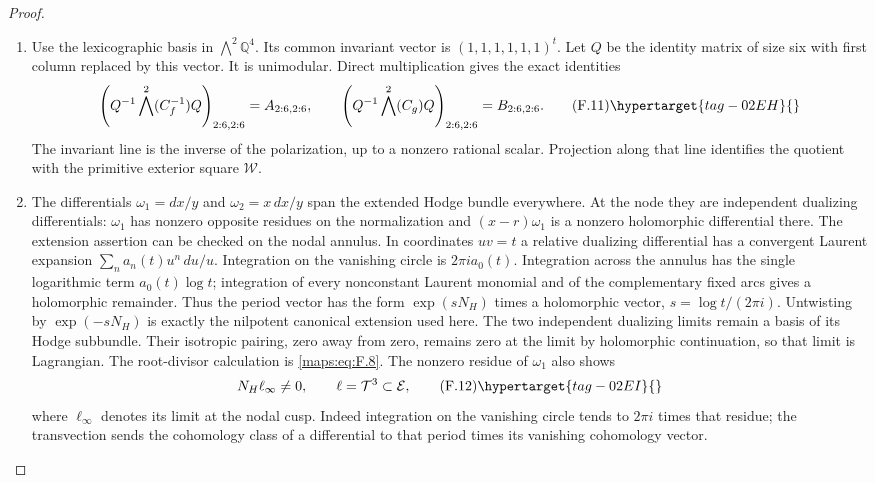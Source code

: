 \begin{proof}
\begin{enumerate}[label={$\langle1\rangle$\arabic*.}]
\[ \tag{F.10}\hypertarget{tag-02EG}{}\label{maps:eq:F.10}
\]
Their difference has rank one and their characteristic polynomials
are $f,g$.  More explicitly, put
\[
 \begin{aligned}
 \mathsf B&=(u,Ru,R^2u,R^3u),\\
 d&=(C_f-C_g)e_4=(0,-1,-1,-1)^t,\\
 \mathsf B_c&=(d,C_fd,C_f^2d,C_f^3d).
 \end{aligned}
\]
Here $\det\mathsf B_c=1$.  Uniqueness of the covector in
\eqref{maps:eq:F.9} gives the intertwiner
$\mathsf P=\mathsf B\mathsf B_c^{-1}$, with
$R\mathsf P=\mathsf P C_f$ and $S\mathsf P=\mathsf P C_g$.
Thus $(T_1,T_2)$ is rationally conjugate to
$(C_f^{-1},C_g)$, with the chosen peripheral conventions.

\item Use the lexicographic basis in $\bigwedge^2\mathbb Q^4$.
Its common invariant vector is $(1,1,1,1,1,1)^t$.
Let $Q$ be the identity matrix of size six with first column
replaced by this vector.  It is unimodular.  Direct multiplication
gives the exact identities
\[
 \left(Q^{-1}\bigwedge^2(C_f^{-1})Q\right)_{2:6,2:6}
   =A_{2:6,2:6},\qquad
 \left(Q^{-1}\bigwedge^2(C_g)Q\right)_{2:6,2:6}
   =B_{2:6,2:6}.
 \tag{F.11}\hypertarget{tag-02EH}{}\label{maps:eq:F.11}
\]
The invariant line is the inverse of the polarization, up to a
nonzero rational scalar.  Projection along that line identifies
the quotient with the primitive exterior square $\mathcal W$.

\item The differentials $\omega_1=dx/y$ and $\omega_2=x\,dx/y$ span
the extended Hodge bundle everywhere.  At the node they are
independent dualizing differentials: $\omega_1$ has nonzero
opposite residues on the normalization and
$(x-r)\omega_1$ is a nonzero holomorphic differential there.
The extension assertion can be checked on the nodal annulus.
In coordinates $uv=t$ a relative dualizing differential has
a convergent Laurent expansion
$\sum_n a_n(t)u^n\,du/u$.  Integration on the vanishing circle
is $2\pi i a_0(t)$.  Integration across the annulus has the
single logarithmic term $a_0(t)\log t$; integration of every
nonconstant Laurent monomial and of the complementary fixed
arcs gives a holomorphic remainder.  Thus the period vector
has the form $\exp(sN_H)$ times a holomorphic vector,
$s=\log t/(2\pi i)$.  Untwisting by $\exp(-sN_H)$ is exactly
the nilpotent canonical extension used here.  The two independent
dualizing limits remain a basis of its Hodge subbundle.
Their isotropic pairing, zero away from zero, remains zero
at the limit by holomorphic continuation, so that limit is
Lagrangian.
The root-divisor calculation is \eqref{maps:eq:F.8}.
The nonzero residue of $\omega_1$ also shows
\[
 N_H\ell_\infty\ne0,
 \qquad \ell=\mathcal T^3\subset\mathcal E,
 \tag{F.12}\hypertarget{tag-02EI}{}\label{maps:eq:F.12}
\]
where $\ell_\infty$ denotes its limit at the nodal cusp.
Indeed integration on the vanishing circle tends to
$2\pi i$ times that residue; the transvection sends the cohomology
class of a differential to that period times its vanishing
cohomology vector.


\end{enumerate}
\end{proof}
